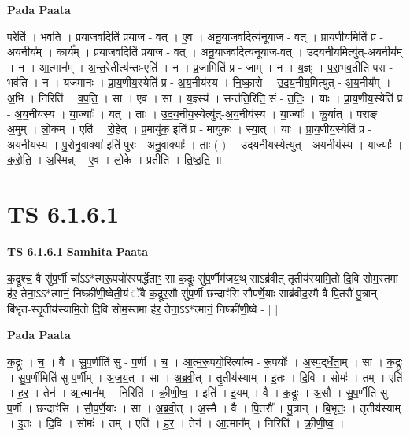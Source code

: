 \documentclass[17pt]{extarticle}
\begin{document}
\textbf{Pada Paata} \newline

परेति॑ । भ॒व॒ति॒ । प्र॒या॒जव॒दिति॑ प्रया॒ज - व॒त् । ए॒व । अ॒नू॒या॒जव॒दित्य॑नूया॒ज - व॒त् । प्रा॒य॒णीय॒मिति॑ प्र - अ॒य॒नीय᳚म् । का॒र्य᳚म् । प्र॒या॒जव॒दिति॑ प्रया॒ज - व॒त् । अ॒नू॒या॒जव॒दित्य॑नूया॒ज-व॒त् । उ॒द॒य॒नीय॒मित्यु॑त्-अ॒य॒नीय᳚म् । न । आ॒त्मान᳚म् । अ॒न्त॒रेतीत्य॑न्तः-एति॑ । न । प्र॒जामिति॑ प्र - जाम् । न । य॒ज्ञ्ः । प॒रा॒भव॒तीति॑ परा - भव॑ति । न । यज॑मानः । प्रा॒य॒णीय॒स्येति॑ प्र - अ॒य॒नीय॑स्य । नि॒ष्का॒से । उ॒द॒य॒नीय॒मित्यु॑त् - अ॒य॒नीय᳚म् । अ॒भि । निरिति॑ । व॒प॒ति॒ । सा । ए॒व । सा । य॒ज्ञ्स्य॑ । सन्त॑ति॒रिति॒ सं - त॒तिः॒ । याः । प्रा॒य॒णीय॒स्येति॑ प्र - अ॒य॒नीय॑स्य । या॒ज्याः᳚ । यत् । ताः । उ॒द॒य॒नीय॒स्येत्यु॑त्-अ॒य॒नीय॑स्य । या॒ज्याः᳚ । कु॒र्यात् । पराङ्॑ । अ॒मुम् । लो॒कम् । एति॑ । रो॒हे॒त् । प्र॒मायु॑क॒ इति॑ प्र - मायु॑कः । स्या॒त् । याः । प्रा॒य॒णीय॒स्येति॑ प्र - अ॒य॒नीय॑स्य । पु॒रो॒नु॒वा॒क्या॑ इति॑ पुरः - अ॒नु॒वा॒क्याः᳚ । ताः ( ) । उ॒द॒य॒नीय॒स्येत्यु॑त् - अ॒य॒नीय॑स्य । या॒ज्याः᳚ । क॒रो॒ति॒ । अ॒स्मिन्न् । ए॒व । लो॒के । प्रतीति॑ । ति॒ष्ठ॒ति॒ ॥  \newline





\section{ TS 6.1.6.1 }

\textbf{TS 6.1.6.1 } \newline
\textbf{Samhita Paata} \newline

क॒द्रूश्च॒ वै सु॑प॒र्णी चा᳚ऽऽ*त्मरू॒पयो॑रस्पर्द्धेताꣳ॒॒ सा क॒द्रूः सु॑प॒र्णीम॑जय॒थ् साऽब्र॑वीत् तृ॒तीय॑स्यामि॒तो दि॒वि सोम॒स्तमा ह॑र॒ तेना॒ऽऽ*त्मानं॒ निष्क्री॑णी॒ष्वेती॒यं ॅवै क॒द्रूर॒सौ सु॑प॒र्णी छन्दाꣳ॑सि सौपर्णे॒याः साब्र॑वीद॒स्मै वै पि॒तरौ॑ पु॒त्रान् बि॑भृत-स्तृ॒तीय॑स्यामि॒तो दि॒वि सोम॒स्तमा ह॑र॒ तेना॒ऽऽ*त्मानं॒ निष्क्री॑णी॒ष्वे - [  ] \newline

\textbf{Pada Paata} \newline

क॒द्रूः । च॒ । वै । सु॒प॒र्णीति॑ सु - प॒र्णी । च॒ । आ॒त्म॒रू॒पयो॒रित्या᳚त्म - रू॒पयोः᳚ । अ॒स्प॒द्‌र्धे॒ता॒म् । सा । क॒द्रूः । सु॒प॒र्णीमिति॑ सु-प॒र्णीम् । अ॒ज॒य॒त् । सा । अ॒ब्र॒वी॒त् । तृ॒तीय॑स्याम् । इ॒तः । दि॒वि । सोमः॑ । तम् । एति॑ । ह॒र॒ । तेन॑ । आ॒त्मान᳚म् । निरिति॑ । क्री॒णी॒ष्व॒ । इति॑ । इ॒यम् । वै । क॒द्रूः । अ॒सौ । सु॒प॒र्णीति॑ सु-प॒र्णी । छन्दाꣳ॑सि । सौ॒प॒र्णे॒याः । सा । अ॒ब्र॒वी॒त् । अ॒स्मै । वै । पि॒तरौ᳚ । पु॒त्रान् । बि॒भृ॒तः॒ । तृ॒तीय॑स्याम् । इ॒तः । दि॒वि । सोमः॑ । तम् । एति॑ । ह॒र॒ । तेन॑ । आ॒त्मान᳚म् । निरिति॑ । क्री॒णी॒ष्व॒ ।  \newline
\end{document}

